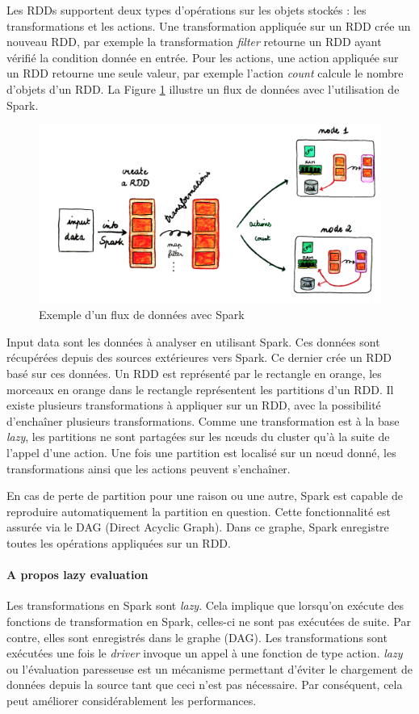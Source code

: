 Les RDDs supportent deux types d'opérations sur les objets stockés : les transformations et les actions. Une  transformation appliquée sur un RDD crée un nouveau RDD, par exemple la transformation \textit{filter} retourne un RDD ayant vérifié la condition donnée en entrée.  Pour les actions, une action appliquée sur un RDD retourne une seule valeur, par exemple l'action \textit{count} calcule le nombre d'objets d'un RDD. La Figure 	\ref{fig:globalviewrdd} illustre un flux de données avec l'utilisation de Spark. 
\begin{figure}[H]
	\centering
	\captionsetup{justification= centering}
	\includegraphics[width=0.7\linewidth]{illustrations/global_view_rdd}
	\caption{Exemple d'un flux de données avec Spark}
	\label{fig:globalviewrdd}
\end{figure}

Input data sont les données à analyser en utilisant Spark. Ces données sont récupérées depuis des sources extérieures vers Spark. Ce dernier crée un RDD basé sur ces données. Un RDD est représenté par le rectangle en orange, les morceaux en orange dans le rectangle représentent les partitions d'un RDD. 
Il existe plusieurs transformations à appliquer sur un RDD, avec la possibilité d'enchaîner plusieurs transformations. Comme une transformation est à la base  \textit{lazy}, les partitions ne sont partagées sur les n\oe{}uds du cluster qu'à la suite de l'appel d'une action. Une fois une partition est localisé sur un n\oe{}ud donné, les transformations ainsi que les actions peuvent s'enchaîner.

En cas de perte de partition pour une raison ou une autre, Spark est capable de reproduire automatiquement la partition en question. Cette fonctionnalité est assurée via le DAG (Direct Acyclic Graph). Dans ce graphe, Spark enregistre toutes les opérations appliquées sur un RDD.
\paragraph{A propos lazy evaluation} \label{lazy-evaluation}
Les transformations en Spark sont \textit{lazy}. Cela implique que lorsqu'on exécute des fonctions de transformation en Spark, celles-ci ne sont pas exécutées de suite. Par contre, elles sont enregistrés dans le graphe (DAG).  Les transformations sont exécutées une fois le \textit{driver} invoque un appel à une fonction de type action. \textit{lazy} ou l'évaluation paresseuse est un mécanisme permettant d'éviter le chargement de données depuis la source tant que ceci n'est pas nécessaire. Par conséquent, cela peut améliorer considérablement les performances.


